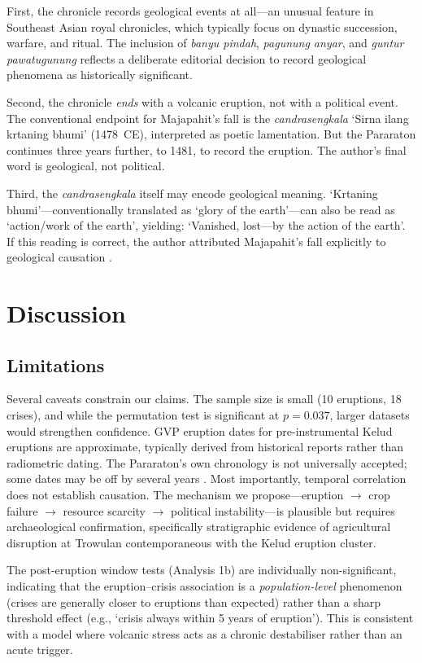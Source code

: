 \documentclass[12pt,a4paper]{article}
\begin{document}
First, the chronicle records geological events at all---an unusual feature in Southeast Asian royal chronicles, which typically focus on dynastic succession, warfare, and ritual.
The inclusion of \textit{banyu pindah}, \textit{pagunung anyar}, and \textit{guntur pawatugunung} reflects a deliberate editorial decision to record geological phenomena as historically significant.

Second, the chronicle \textit{ends} with a volcanic eruption, not with a political event.
The conventional endpoint for Majapahit's fall is the \textit{candrasengkala} `Sirna ilang krtaning bhumi' (1478~CE), interpreted as poetic lamentation.
But the Pararaton continues three years further, to 1481, to record the eruption.
The author's final word is geological, not political.

Third, the \textit{candrasengkala} itself may encode geological meaning.
`Krtaning bhumi'---conventionally translated as `glory of the earth'---can also be read as `action/work of the earth', yielding: `Vanished, lost---by the action of the earth'.
If this reading is correct, the author attributed Majapahit's fall explicitly to geological causation \citep{satyana2015}.

\section{Discussion}

\subsection{Limitations}

Several caveats constrain our claims.
The sample size is small (10 eruptions, 18 crises), and while the permutation test is significant at $p = 0.037$, larger datasets would strengthen confidence.
GVP eruption dates for pre-instrumental Kelud eruptions are approximate, typically derived from historical reports rather than radiometric dating.
The Pararaton's own chronology is not universally accepted; some dates may be off by several years \citep{noorduyn1978}.
Most importantly, temporal correlation does not establish causation.
The mechanism we propose---eruption $\rightarrow$ crop failure $\rightarrow$ resource scarcity $\rightarrow$ political instability---is plausible but requires archaeological confirmation, specifically stratigraphic evidence of agricultural disruption at Trowulan contemporaneous with the Kelud eruption cluster.

The post-eruption window tests (Analysis 1b) are individually non-significant, indicating that the eruption--crisis association is a \textit{population-level} phenomenon (crises are generally closer to eruptions than expected) rather than a sharp threshold effect (e.g., `crisis always within 5 years of eruption').
This is consistent with a model where volcanic stress acts as a chronic destabiliser rather than an acute trigger.
\end{document}
